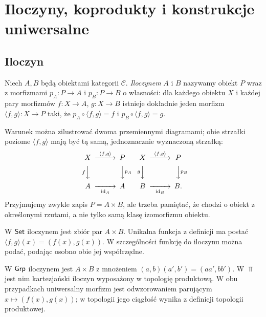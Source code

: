 \section{Iloczyny, koprodukty i konstrukcje uniwersalne}\label{sec:produkty}

\subsection{Iloczyn}

\begin{definicja}\label{def:produkt}
Niech $A,B$ będą obiektami kategorii $\mathcal C$. \emph{Iloczynem} $A$ i $B$ nazywamy obiekt $P$ wraz z morfizmami $p_A:P\to A$ i $p_B:P\to B$ o własności: dla każdego obiektu $X$ i każdej pary morfizmów $f:X\to A$, $g:X\to B$ istnieje dokładnie jeden morfizm $\langle f,g\rangle:X\to P$ taki, że $p_A\circ\langle f,g\rangle=f$ i $p_B\circ\langle f,g\rangle=g$.
\end{definicja}

Warunek można zilustrować dwoma przemiennymi diagramami; obie strzałki poziome $\langle f,g\rangle$ mają być tą samą, jednoznacznie wyznaczoną strzałką:
\[
\begin{CD}
X @>{\langle f,g\rangle}>> P\\
@V{f}VV @VV{p_A}V\\
A @>>{\id_A}> A
\end{CD}
\qquad
\begin{CD}
X @>{\langle f,g\rangle}>> P\\
@V{g}VV @VV{p_B}V\\
B @>>{\id_B}> B.
\end{CD}
\]
Przyjmujemy zwykle zapis $P=A\times B$, ale trzeba pamiętać, że chodzi o obiekt z określonymi rzutami, a nie tylko samą klasę izomorfizmu obiektu.

\begin{przyklad}[Zbiory]
W $\mathsf{Set}$ iloczynem jest zbiór par $A\times B$. Unikalna funkcja z definicji ma postać $\langle f,g\rangle(x)=(f(x),g(x))$. W szczególności funkcję do iloczynu można podać, podając osobno obie jej współrzędne.
\end{przyklad}

\begin{przyklad}
W $\mathsf{Grp}$ iloczynem jest $A\times B$ z mnożeniem $(a,b)(a',b')=(aa',bb')$. W $\Top$ jest nim kartezjański iloczyn wyposażony w topologię produktową. W obu przypadkach uniwersalny morfizm jest odwzorowaniem parującym $x\mapsto(f(x),g(x))$; w topologii jego ciągłość wynika z definicji topologii produktowej.
\end{przyklad}

